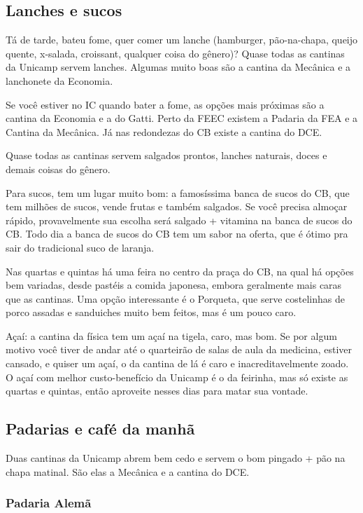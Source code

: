 \subsection{Lanches e sucos}

Tá de tarde, bateu fome, quer comer um lanche (hamburger, pão-na-chapa, queijo
quente, x-salada, croissant, qualquer coisa do gênero)? Quase todas as cantinas
da Unicamp servem lanches. Algumas muito boas são a cantina da Mecânica e a
lanchonete da Economia.

Se você estiver no IC quando bater a fome, as opções mais próximas são a cantina
da Economia e a do Gatti. Perto da FEEC existem a Padaria da FEA e a Cantina da
Mecânica. Já nas redondezas do CB existe a cantina do DCE.

Quase todas as cantinas servem salgados prontos, lanches naturais, doces e
demais coisas do gênero.

Para sucos, tem um lugar muito bom: a famosíssima banca de sucos do CB, que tem
milhões de sucos, vende frutas e também salgados.  Se você precisa almoçar
rápido, provavelmente sua escolha será salgado + vitamina na banca de sucos do
CB. Todo dia a banca de sucos do CB tem um sabor na oferta, que é ótimo pra sair
do tradicional suco de laranja.

Nas quartas e quintas há uma feira no centro da praça do CB, na qual há opções bem
variadas, desde pastéis a comida japonesa, embora geralmente mais caras que as
cantinas. Uma opção interessante é o Porqueta, que serve costelinhas de porco
assadas e sanduiches muito bem feitos, mas é um pouco caro.

Açaí: a cantina da física tem um açaí na tigela, caro, mas bom. Se por algum
motivo você tiver de andar até o quarteirão de salas de aula da medicina,
estiver cansado, e quiser um açaí, o da cantina de lá é caro e
inacreditavelmente zoado. O açaí com melhor custo-benefício da Unicamp é o da 
feirinha, mas só existe as quartas e quintas, então aproveite nesses dias para
matar sua vontade.


\subsection{Padarias e café da manhã}

Duas cantinas da Unicamp abrem bem cedo e servem o bom pingado + pão na chapa
matinal. São elas a Mecânica e a cantina do DCE.

\subsubsection{Padaria Alemã}

